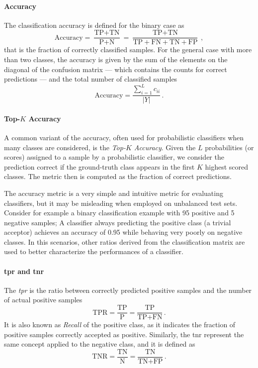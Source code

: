 \paragraph{Accuracy} The classification accuracy is defined for the binary case as
\begin{equation} \label{eq:back:accuracy-binary}
    \text{Accuracy} = \frac{\text{TP} + \text{TN}}{\text{P} + \text{N}} = \frac{\text{TP} + \text{TN}}{\text{TP} + \text{FN} + \text{TN} + \text{FP}} \,,
\end{equation}
that is the fraction of correctly classified samples.
For the general case with more than two classes, the accuracy is given by the sum of the elements on the diagonal of the confusion matrix --- which contains the counts for correct predictions --- and the total number of classified samples
\begin{equation} \label{eq:back:accuracy}
    \text{Accuracy} = \frac{\sum_{i=1}^L c_{ii}}{|Y|} \,.
\end{equation}

\paragraph{Top-$K$ Accuracy}
A common variant of the accuracy, often used for probabilistic classifiers when many classes are considered, is the \emph{Top-$K$ Accuracy}.
Given the $L$ probabilities (or scores) assigned to a sample by a probabilistic classifier, we consider the prediction correct if the ground-truth class appears in the first $K$ highest scored classes.
The metric then is computed as the fraction of correct predictions.

The accuracy metric is a very simple and intuitive metric for evaluating classifiers, but it may be misleading when employed on unbalanced test sets.
Consider for example a binary classification example with 95 positive and 5 negative samples;
A classifier always predicting the positive class (a trivial acceptor) achieves an accuracy of 0.95 while behaving very poorly on negative classes.
In this scenarios, other ratios derived from the classification matrix are used to better characterize the performances of a classifier.

\paragraph{\acrshort{tpr} and \acrshort{tnr}}
The \emph{\gls{tpr}} is the ratio between correctly predicted positive samples and the number of actual positive samples
\begin{equation} \label{eq:back:tpr}
    \text{TPR} = \frac{\text{TP}}{\text{P}} = \frac{\text{TP}}{\text{TP} + \text{FN}} \,.
\end{equation}
It is also known as \emph{Recall} of the positive class, as it indicates the fraction of positive samples correctly accepted as positive.
Similarly, the \gls{tnr} represent the same concept applied to the negative class, and it is defined as
\begin{equation} \label{eq:back:tnr}
    \text{TNR} = \frac{\text{TN}}{\text{N}} = \frac{\text{TN}}{\text{TN} + \text{FP}} \,.
\end{equation}

